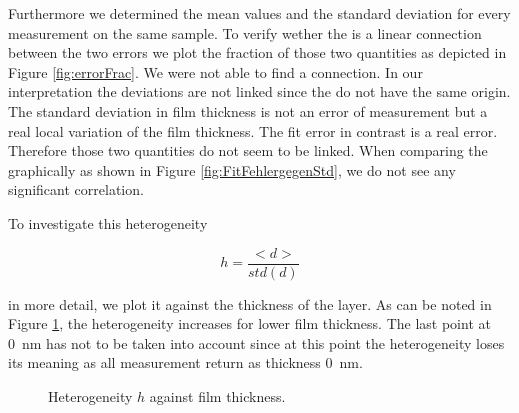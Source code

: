 Furthermore we determined the mean values and the standard deviation for every measurement on the same sample. To verify wether the is a 
linear connection between the two errors we plot the fraction of those two quantities as depicted in Figure \ref{fig:errorFrac}. We were not able to find a connection.
In our interpretation the deviations are not linked since the do not have the same origin. The standard deviation in film thickness is 
not an error of measurement but a real local variation of the film  thickness. The fit error in contrast is a real error. Therefore those two quantities do not seem to be linked. When
comparing the graphically as shown in Figure \ref{fig:FitFehlergegenStd}, we do not see any significant correlation.



To investigate this heterogeneity

\begin{equation}
    h = \frac{< d >}{std(d)}
\end{equation}

in more detail, we plot it against the thickness of the layer. As can be noted in Figure \ref{fig:thickheter}, the heterogeneity
increases for lower film thickness. The last point at \SI{0}{\nano\meter} has not to be taken into account since at this point the heterogeneity loses its meaning as all measurement 
return as thickness \SI{0}{\nano\meter}.

\begin{figure}[h]
    \centering
    
    \caption{Heterogeneity $h$ against film thickness.}
    \label{fig:thickheter}
\end{figure}

%         
    

%            



